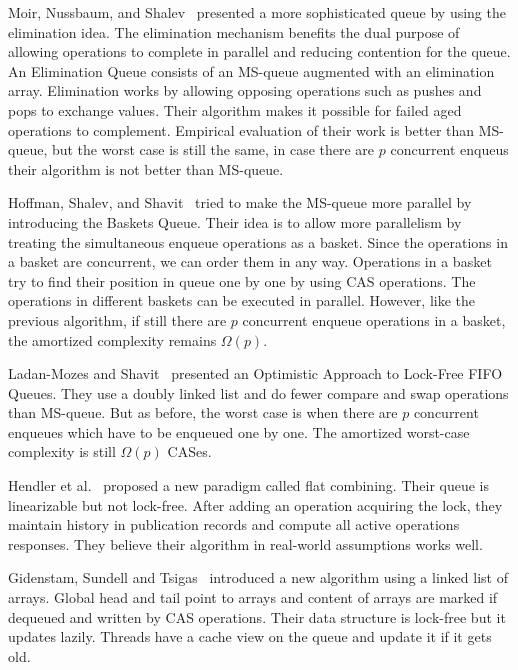 \documentclass{article}
\begin{document}
Moir, Nussbaum, and Shalev~\cite{DBLP:conf/spaa/MoirNSS05} presented a more sophisticated queue by using the elimination idea. The elimination mechanism benefits the dual purpose of allowing operations to complete in parallel and reducing contention for the queue. An Elimination Queue consists of an MS-queue augmented with an elimination array. Elimination works by allowing opposing operations such as pushes and pops to exchange values. Their algorithm makes it possible for failed aged operations to complement. Empirical evaluation of their work is better than MS-queue, but the worst case is still the same, in case there are $p$ concurrent enqueus their algorithm is not better than MS-queue. 


Hoffman, Shalev, and Shavit~\cite{DBLP:conf/opodis/HoffmanSS07} tried to make the MS-queue more parallel by introducing the Baskets Queue. Their idea is to allow more parallelism by treating the simultaneous enqueue operations as a basket. Since the operations in a basket are concurrent, we can order them in any way. Operations in a basket try to find their position in queue one by one by using CAS operations. The operations in different baskets can be executed in parallel. However, like the previous algorithm, if still there are $p$ concurrent enqueue operations in a basket, the amortized complexity remains $\Omega(p)$.

Ladan-Mozes and Shavit~\cite{DBLP:journals/dc/Ladan-MozesS08} presented an Optimistic Approach to Lock-Free FIFO Queues. They use a doubly linked list and do fewer compare and swap operations than MS-queue. But as before, the worst case is when there are $p$ concurrent enqueues which have to be enqueued one by one. The amortized worst-case complexity is still $\Omega(p)$ CASes.

Hendler et al.~\cite{DBLP:conf/spaa/HendlerIST10} proposed a new paradigm called flat combining. Their queue is linearizable but not lock-free. After adding an operation acquiring the lock, they maintain history in publication records and compute all active operations responses. They believe their algorithm in real-world assumptions works well.

Gidenstam, Sundell and Tsigas~\cite{DBLP:conf/opodis/GidenstamST10} introduced a new algorithm using a linked list of arrays. Global head and tail point to arrays and content of arrays are marked if dequeued and written by CAS operations. Their data structure is lock-free but it updates lazily. Threads have a cache view on the queue and update it if it gets old.
\end{document}
